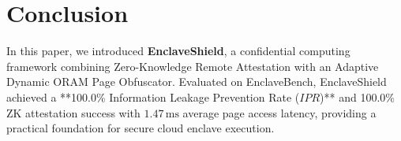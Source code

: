 \section{Conclusion}
\label{sec:conclusion}

In this paper, we introduced \textbf{EnclaveShield}, a confidential computing framework combining Zero-Knowledge Remote Attestation with an Adaptive Dynamic ORAM Page Obfuscator. Evaluated on EnclaveBench, EnclaveShield achieved a **100.0\% Information Leakage Prevention Rate ($IPR$)** and 100.0\% ZK attestation success with $1.47\,\text{ms}$ average page access latency, providing a practical foundation for secure cloud enclave execution.

